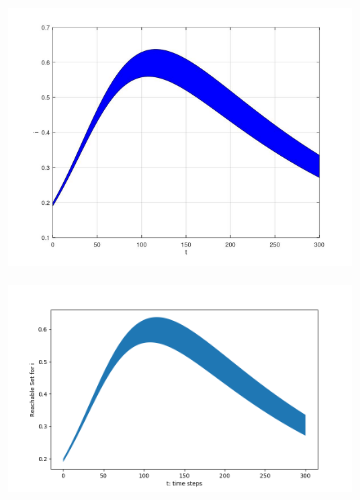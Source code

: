 \documentclass[EPiC]{easychair}
\begin{document}
\begin{figure}[h]
    \begin{subfigure}{0.5\textwidth}
    \centering
    \includegraphics[width=\textwidth]{SapoFigures/SIR/SapoSIR_I.jpg}
    \end{subfigure}
    \begin{subfigure}{0.6\textwidth}
    \centering
    \includegraphics[width=\textwidth]{SapoFigures/SIR/KaaSIR_I.png}
    \end{subfigure}
    

\end{figure}
\end{document}

